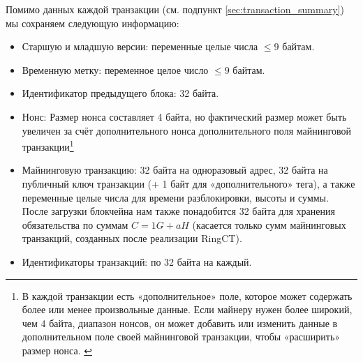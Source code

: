 Помимо данных каждой транзакции (см. подпункт \ref{sec:transaction_summary}) мы сохраняем следующую информа\-цию:
\begin{itemize}
    \setlength\itemsep{\listspace}
    \item Старшую и младшую версии: переменные целые числа $\leq 9$ байтам.
    \item Временную метку: переменное целое число $\leq 9$ байтам.
    \item Идентификатор предыдущего блока: 32 байта.
    \item Нонс: Размер нонса составляет 4 байта, но фактический размер может быть увеличен за счёт дополнительного нонса дополнительного поля майнинговой транзакции\footnote{В каждой транзакции есть «дополнительное» поле, которое может содержать более или менее произвольные данные. Если майнеру нужен более широкий, чем 4 байта, диапазон нонсов, он может добавить или изменить данные в дополнительном поле своей майнинговой транзакции, чтобы «расширить» размер нонса. \cite{extra-field-stackexchange}}
    \item Майнинговую транзакцию: 32 байта на одноразовый адрес, 32 байта на публичный ключ транзакции (+ 1 байт для «дополнительного» тега), а также переменные целые числа для времени разблокировки, высоты и суммы. После загрузки блокчейна нам также понадобится 32 байта для хранения обязательства по суммам $C = 1G + a H$ (касается только сумм майнинговых транзакций, созданных после реализации RingCT).
    \item Идентификаторы транзакций: по 32 байта на каждый.
\end{itemize}